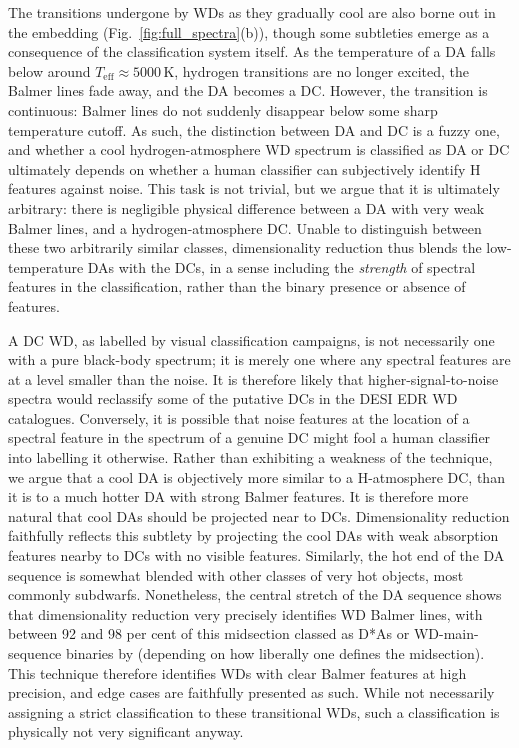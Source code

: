\documentclass[fleqn,usenatbib]{mnras}
\def\Teff{T_\mathrm{eff}}
\begin{document}
The transitions undergone by WDs as they gradually cool are also borne out in the embedding (Fig.~\ref{fig:full_spectra}(b)), though some subtleties emerge as a consequence of the classification system itself.
As the temperature of a DA falls below around $\Teff\approx 5000\,\text{K}$, hydrogen transitions are no longer excited, the Balmer lines fade away, and the DA becomes a DC.
However, the transition is continuous: Balmer lines do not suddenly disappear below some sharp temperature cutoff.
As such, the distinction between DA and DC is a fuzzy one, and whether a cool hydrogen-atmosphere WD spectrum is classified as DA or DC ultimately depends on whether a human classifier can subjectively identify H features against noise.
This task is not trivial, but we argue that it is ultimately arbitrary: there is negligible physical difference between a DA with very weak Balmer lines, and a hydrogen-atmosphere DC.
Unable to distinguish between these two arbitrarily similar classes, dimensionality reduction thus blends the low-temperature DAs with the DCs, in a sense including the \textit{strength} of spectral features in the classification, rather than the binary presence or absence of features.

A DC WD, as labelled by visual classification campaigns, is not necessarily one with a pure black-body spectrum; it is merely one where any spectral features are at a level smaller than the noise.
It is therefore likely that higher-signal-to-noise spectra would reclassify some of the putative DCs in the DESI EDR WD catalogues.
Conversely, it is possible that noise features at the location of a spectral feature in the spectrum of a genuine DC might fool a human classifier into labelling it otherwise.
Rather than exhibiting a weakness of the technique, we argue that a cool DA is objectively more similar to a H-atmosphere DC, than it is to a much hotter DA with strong Balmer features.
It is therefore more natural that cool DAs should be projected near to DCs.
Dimensionality reduction faithfully reflects this subtlety by projecting the cool DAs with weak absorption features nearby to DCs with no visible features.
Similarly, the hot end of the DA sequence is somewhat blended with other classes of very hot objects, most commonly subdwarfs.
Nonetheless, the central stretch of the DA sequence shows that dimensionality reduction very precisely identifies WD Balmer lines, with between 92 and 98 per cent of this midsection classed as D*As or WD-main-sequence binaries by \citet{manser24} (depending on how liberally one defines the midsection).
This technique therefore identifies WDs with clear Balmer features at high precision, and edge cases are faithfully presented as such.
While not necessarily assigning a strict classification to these transitional WDs, such a classification is physically not very significant anyway. 
\end{document}
